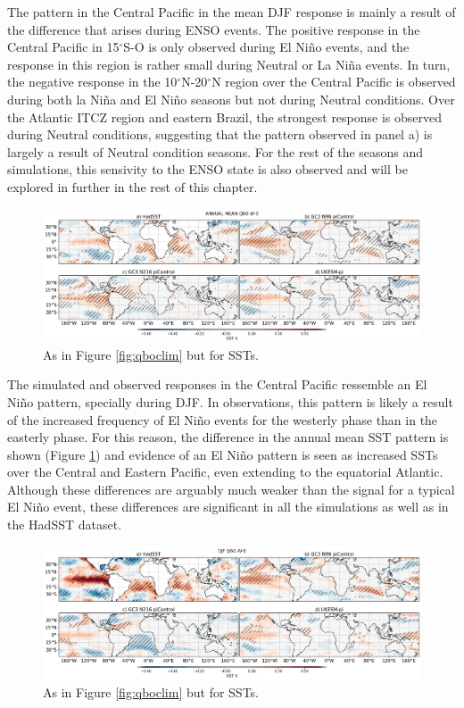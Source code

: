 The pattern in the Central Pacific in the mean DJF response is mainly a result of the difference that arises during ENSO events. The positive response in the Central Pacific in 15$^\circ$S-O is only observed during El Niño events, and the response in this region is rather small during Neutral or La Niña events. In turn, the negative response in the 10$^\circ$N-20$^\circ$N region over the Central Pacific is observed during both la Niña and El Niño seasons but not during Neutral conditions. 
Over the Atlantic ITCZ region and eastern Brazil, the strongest response is observed during Neutral conditions, suggesting that the pattern observed in panel a) is largely a result of Neutral condition seasons. For the rest of the seasons and simulations, this sensivity to the ENSO state is also observed and will be explored in further in the rest of this chapter. 

\begin{figure}[t!]
\centering
 \includegraphics[width=\linewidth]{figures/pisstclimqbowqboe.png}
\caption[Annual mean SST difference QBO W-E under different QBO phases.]{ As in Figure \ref{fig:qboclim} but for SSTs.}
\label{fig:sstclim}
\end{figure}

The simulated and observed responses in the Central Pacific ressemble an El Niño pattern, specially during DJF. In observations, this pattern is likely a result of the increased frequency of El Niño events for the westerly phase than in the easterly phase. 
For this reason, the difference in the annual mean SST pattern is shown (Figure \ref{fig:sstclim}) and evidence of an El Niño pattern is seen as increased SSTs over the Central and Eastern Pacific, even extending to the equatorial Atlantic. 
Although these differences are arguably much weaker than the signal for a typical El Niño event, these differences are significant in all the simulations as well as in the HadSST dataset. 

\begin{figure}[t!]
\centering
 \includegraphics[width=\linewidth]{figures/pisstdjfqbowqboe.png}
\caption[Annual mean SST difference QBO W-E under different QBO phases.]{ As in Figure \ref{fig:qboclim} but for SSTs.}
\label{fig:djfclim}
\end{figure}

